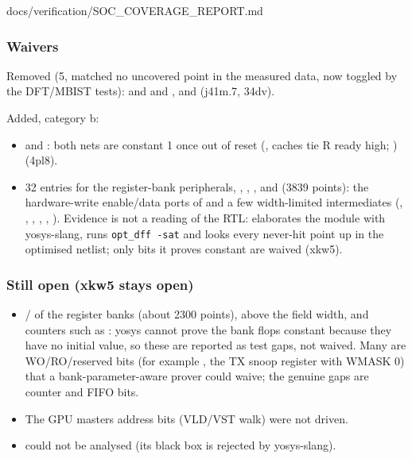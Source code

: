 \begin{relocated}{docs/verification/SOC_COVERAGE_REPORT.md}
\subsubsection{Waivers}\label{tm:flow:soc-coverage-report:waivers}

Removed (5, matched no uncovered point in the measured data, now toggled
by the DFT/MBIST tests):  and 
 and , and
  (j41m.7, 34dv).

Added, category b:

\begin{itemize}
\tightlist
\item
    and
  : both nets are constant 1 once out of
  reset (, caches tie R ready high;
  ) (4pl8).
\item
  32 entries for the register-bank peripherals, ,
  , ,  and
   (3839 points): the hardware-write
  enable/\allowbreak{}data ports of  and a few
  width-limited intermediates (, ,
  , , , ).
  Evidence is not a reading of the RTL:
   elaborates the module with
  yosys-slang, runs \texttt{opt\_\allowbreak{}dff\ -\allowbreak{}sat}
  and looks every never-hit point up in the optimised netlist; only bits
  it proves constant are waived (xkw5).
\end{itemize}

\subsubsection{Still open (xkw5 stays open)}\label{tm:flow:soc-coverage-report:still-open-xkw5-stays-open}

\begin{itemize}
\tightlist
\item
   /  of the register banks (about 2300 points),
   above the field width, and counters such as
  : yosys cannot prove the bank flops constant
  because they have no initial value, so these are reported as test
  gaps, not waived. Many are WO/\allowbreak{}RO/\allowbreak{}reserved
  bits (for example  , the TX snoop register
  with WMASK 0) that a bank-parameter-aware prover could waive; the
  genuine gaps are counter and FIFO bits.
\item
  The GPU master\textquotesingle s address bits (VLD/VST walk) were not
  driven.
\item
   could not be analysed (its 
  black box is rejected by yosys-slang).
\end{itemize}


\end{relocated}
